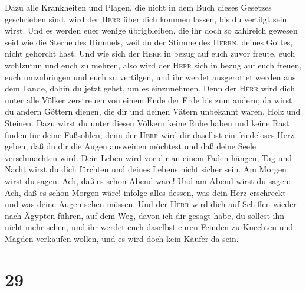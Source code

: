 Dazu alle Krankheiten und Plagen, die nicht in dem Buch dieses Gesetzes
geschrieben sind, wird der \textsc{Herr} über dich kommen lassen, bis du
vertilgt sein wirst.  Und es werden euer wenige
übrigbleiben, die ihr doch so zahlreich gewesen seid wie die Sterne des
Himmels, weil du der Stimme des \textsc{Herrn}, deines Gottes, nicht
gehorcht hast.  Und wie sich der \textsc{Herr} in bezug
auf euch zuvor freute, euch wohlzutun und euch zu mehren, also wird der
\textsc{Herr} sich in bezug auf euch freuen, euch umzubringen und euch
zu vertilgen, und ihr werdet ausgerottet werden aus dem Lande, dahin du
jetzt gehst, um es einzunehmen.  Denn der \textsc{Herr}
wird dich unter alle Völker zerstreuen von einem Ende der Erde bis zum
andern; da wirst du andern Göttern dienen, die dir und deinen Vätern
unbekannt waren, Holz und Steinen.  Dazu wirst du unter
diesen Völkern keine Ruhe haben und keine Rast finden für deine
Fußsohlen; denn der \textsc{Herr} wird dir daselbst ein friedeloses Herz
geben, daß du dir die Augen ausweinen möchtest und daß deine Seele
verschmachten wird.  Dein Leben wird vor dir an einem
Faden hängen; Tag und Nacht wirst du dich fürchten und deines Lebens
nicht sicher sein.  Am Morgen wirst du sagen: Ach, daß es
schon Abend wäre! Und am Abend wirst du sagen: Ach, daß es schon Morgen
wäre! infolge alles dessen, was dein Herz erschreckt und was deine Augen
sehen müssen.  Und der \textsc{Herr} wird dich auf
Schiffen wieder nach Ägypten führen, auf dem Weg, davon ich dir gesagt
habe, du sollest ihn nicht mehr sehen, und ihr werdet euch daselbst
euren Feinden zu Knechten und Mägden verkaufen wollen, und es wird doch
kein Käufer da sein.

\hypertarget{section-28}{%
\section{29}\label{section-28}}

